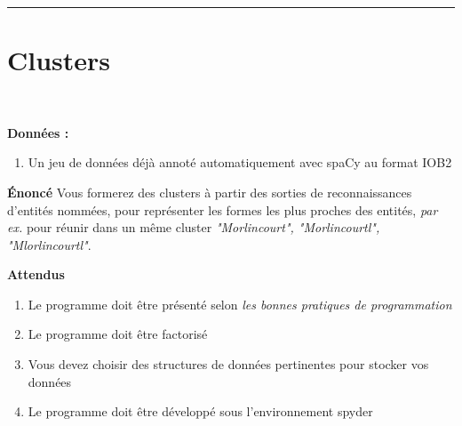 \newcommand{\numTD}{TD3}
\newcommand{\themeTD}{Clustering avec un algorithm d'affinité de propagation}
\newcommand{\file}{toto.tex}



\hrule

\noindent{}
\newline
\section{Clusters}
~\\
\vspace{-1cm}


\textbf{Données :}
\begin{enumerate}
  \item Un jeu de données déjà annoté automatiquement avec spaCy au format IOB2
\end{enumerate}


\textbf{Énoncé}
Vous formerez des clusters à partir des sorties de reconnaissances d'entités nommées, pour représenter les formes les plus proches des entités, \textit{par ex.} pour réunir dans un même cluster \textit{"Morlincourt", "Morlincourtl", "Mlorlincourtl"}.


\textbf{Attendus}
\begin{enumerate}
  \item Le programme doit être présenté selon \textit{les bonnes pratiques de programmation}
  \item Le programme doit être factorisé
  \item Vous devez choisir des structures de données pertinentes pour stocker vos données
  \item Le programme doit être développé sous l'environnement spyder 
\end{enumerate}

